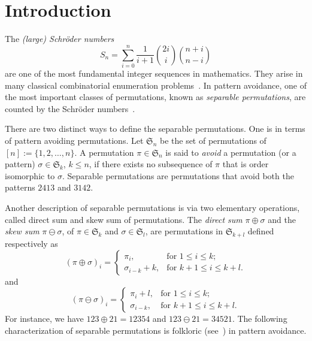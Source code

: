 \documentclass[12pt]{amsart}
\numberwithin{equation}{section}
\theoremstyle{plain}
\theoremstyle{definition}
\def\S{\mathfrak{S}}
\begin{document}
\maketitle



\section{Introduction}\label{sec1: intro}

The {\em (large) Schr\"oder numbers } 
$$
S_n=\sum_{i=0}^n\frac{1}{i+1}\binom{2i}{i}\binom{n+i}{n-i}
$$
are one of the most fundamental integer sequences in mathematics. They arise in many classical combinatorial enumeration problems~\cite{kit,shapi2,stan}. In pattern avoidance, one of  the most important classes of permutations, known as {\em separable permutations}, are counted by the Schr\"oder numbers~\cite{shapi,wes,sk}. 

There are two distinct ways to define the separable permutations. One is in terms of pattern avoiding permutations. Let $\S_n$ be the set of permutations of $[n]:=\{1,2,\ldots,n\}$. A permutation $\pi\in\S_n$ is said to {\em avoid} a permutation (or a pattern) $\sigma\in\S_k$, $k\leq n$, if there exists no subsequence of $\pi$ that is order isomorphic to $\sigma$. Separable permutations are permutations that avoid both the patterns $2413$ and $3142$. 

Another description of separable permutations is via two elementary  operations, called direct sum and skew sum of permutations. 
The \emph{direct sum} $\pi\oplus\sigma$ and the \emph{skew sum} $\pi\ominus\sigma$, of $\pi\in\S_k$ and $\sigma\in\S_l$, are permutations in $\S_{k+l}$ defined respectively as
$$
(\pi\oplus\sigma)_i=
\begin{cases}
\pi_i, &\text{for $1\leq i\leq k$};\\
\sigma_{i-k}+k, &\text{for $k+1\leq i\leq k+l$}.
\end{cases}
$$
and
$$
(\pi\ominus\sigma)_i=
\begin{cases}
\pi_i+l, &\text{for $1\leq i\leq k$};\\
\sigma_{i-k}, &\text{for $k+1\leq i\leq k+l$}.
\end{cases}
$$
 For instance, we have $123\oplus 21=12354$ and $123\ominus 21=34521$. The following  characterization of separable permutations is  folkloric  (see~\cite[p.~57--58]{kit}) in pattern avoidance. 
 
\end{document}

